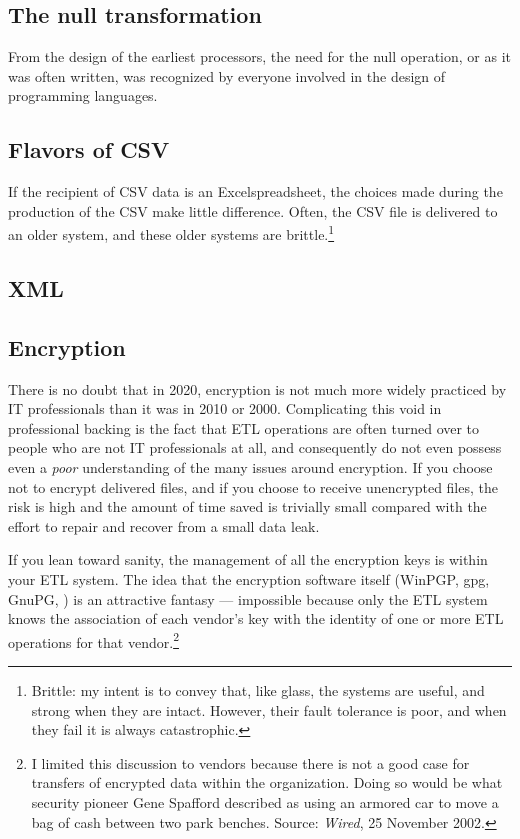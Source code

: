 \documentclass[11pt,letterpaper,twosided]{memoir}
\begin{document}
\subsection{The null transformation}

From the design of the earliest processors, the need for the null 
operation, or  as it was often written, was recognized by
everyone involved in the design of programming languages. 

\subsection{Flavors of CSV}

If the recipient of CSV data is an Excel\CircleR\thinspace spreadsheet,
the choices made during the production of the CSV make little 
difference. Often, the CSV file is delivered to an older system, and
these older systems are brittle.\footnote{Brittle: my intent is to
convey that, like glass, the systems are useful, and strong when they are intact.
However, their fault tolerance is poor, and when they fail it is
always catastrophic.}

\subsection{XML}

\subsection{Encryption}

There is no doubt that in 2020, encryption is not much more widely
practiced by IT professionals than it was in 2010 or 2000.
Complicating this void in professional backing is the fact
that ETL operations are often turned over to people who are not IT
professionals at all, and consequently do not even possess even a
\emph{poor} understanding of the many issues around encryption.
If you choose not to encrypt delivered files, and if you choose to
receive unencrypted files, the risk is high and the amount of time
saved is trivially small compared with the effort to repair and
recover from a small data leak.

If you lean toward sanity, the management of all the encryption
keys is within your ETL system. The idea that the encryption software
itself (WinPGP, gpg, GnuPG, \etc) is an attractive fantasy ---
impossible because only the ETL system knows the association of
each vendor's key with the identity of one or more ETL operations
for that vendor.\footnote{I limited this discussion to vendors
because there is not a good case for transfers of encrypted data
within the organization. Doing so would be what security pioneer
Gene Spafford described as using an armored car to move a bag of
cash between two park benches. Source: \emph{Wired}, 25 November
2002.}
\end{document}
